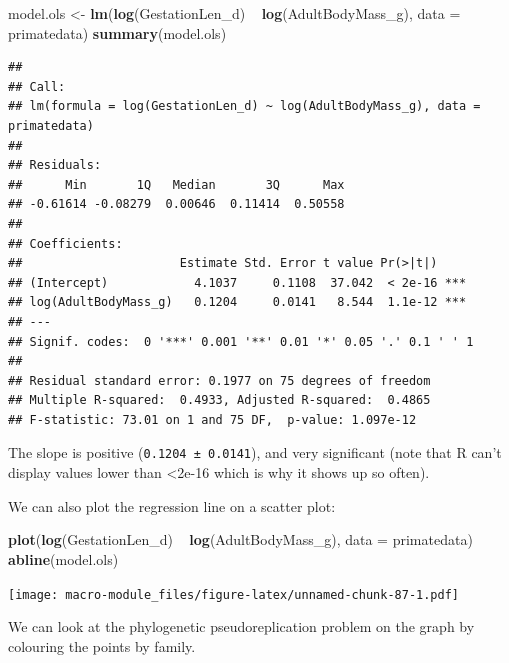 \documentclass[]{book}
\newenvironment{Shaded}{\begin{snugshade}}{\end{snugshade}}
\newcommand{\KeywordTok}[1]{\textcolor[rgb]{0.13,0.29,0.53}{\textbf{{#1}}}}
\newcommand{\DataTypeTok}[1]{\textcolor[rgb]{0.13,0.29,0.53}{{#1}}}
\newcommand{\DecValTok}[1]{\textcolor[rgb]{0.00,0.00,0.81}{{#1}}}
\newcommand{\StringTok}[1]{\textcolor[rgb]{0.31,0.60,0.02}{{#1}}}
\newcommand{\NormalTok}[1]{{#1}}
\begin{document}
\begin{Shaded}
\begin{Highlighting}[]
\NormalTok{model.ols <-}\StringTok{ }\KeywordTok{lm}\NormalTok{(}\KeywordTok{log}\NormalTok{(GestationLen_d) ~}\StringTok{ }\KeywordTok{log}\NormalTok{(AdultBodyMass_g), }\DataTypeTok{data =} \NormalTok{primatedata)}
\KeywordTok{summary}\NormalTok{(model.ols)}
\end{Highlighting}
\end{Shaded}

\begin{verbatim}
## 
## Call:
## lm(formula = log(GestationLen_d) ~ log(AdultBodyMass_g), data = primatedata)
## 
## Residuals:
##      Min       1Q   Median       3Q      Max 
## -0.61614 -0.08279  0.00646  0.11414  0.50558 
## 
## Coefficients:
##                      Estimate Std. Error t value Pr(>|t|)    
## (Intercept)            4.1037     0.1108  37.042  < 2e-16 ***
## log(AdultBodyMass_g)   0.1204     0.0141   8.544  1.1e-12 ***
## ---
## Signif. codes:  0 '***' 0.001 '**' 0.01 '*' 0.05 '.' 0.1 ' ' 1
## 
## Residual standard error: 0.1977 on 75 degrees of freedom
## Multiple R-squared:  0.4933, Adjusted R-squared:  0.4865 
## F-statistic: 73.01 on 1 and 75 DF,  p-value: 1.097e-12
\end{verbatim}

The slope is positive (\texttt{0.1204\ ±\ 0.0141}), and very significant
(note that R can't display values lower than \textless{}2e-16 which is
why it shows up so often).

We can also plot the regression line on a scatter plot:

\begin{Shaded}
\begin{Highlighting}[]
\KeywordTok{plot}\NormalTok{(}\KeywordTok{log}\NormalTok{(GestationLen_d) ~}\StringTok{ }\KeywordTok{log}\NormalTok{(AdultBodyMass_g), }\DataTypeTok{data =} \NormalTok{primatedata)}
\KeywordTok{abline}\NormalTok{(model.ols)}
\end{Highlighting}
\end{Shaded}

\texttt{[image: macro-module\_files/figure-latex/unnamed-chunk-87-1.pdf]}

We can look at the phylogenetic pseudoreplication problem on the graph
by colouring the points by family.

\begin{Shaded}
\end{Shaded}
\end{document}
